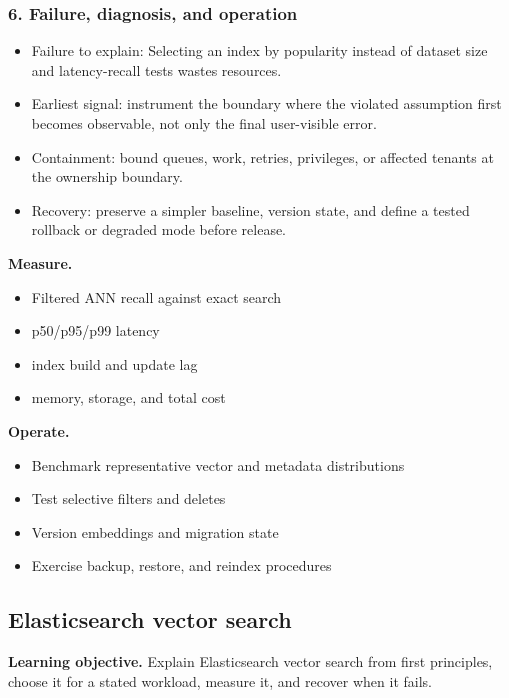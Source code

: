 \subsubsection*{6. Failure, diagnosis, and operation}
\begin{itemize}
\item Failure to explain: Selecting an index by popularity instead of dataset size and latency-recall tests wastes resources.
\item Earliest signal: instrument the boundary where the violated assumption first becomes observable, not only the final user-visible error.
\item Containment: bound queues, work, retries, privileges, or affected tenants at the ownership boundary.
\item Recovery: preserve a simpler baseline, version state, and define a tested rollback or degraded mode before release.
\end{itemize}
\textbf{Measure.}\begin{itemize}
\item Filtered ANN recall against exact search
\item p50/p95/p99 latency
\item index build and update lag
\item memory, storage, and total cost
\end{itemize}
\textbf{Operate.}\begin{itemize}
\item Benchmark representative vector and metadata distributions
\item Test selective filters and deletes
\item Version embeddings and migration state
\item Exercise backup, restore, and reindex procedures
\end{itemize}
\subsection{Elasticsearch vector search}
\textbf{Learning objective.} Explain Elasticsearch vector search from first principles, choose it for a stated workload, measure it, and recover when it fails.
